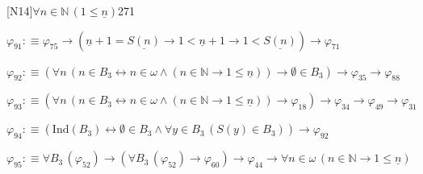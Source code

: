 \begin{fullproof}{[N14]}{$\forall n \in \mathbb{N}\,(1 \leq \underline{n})$}{271}
\begin{abbrevlist}
\item $\varphi_{91} :\equiv \varphi_{75} \to (\underline{n} + 1 = \underline{S(n)} \to 1 < \underline{n} + 1 \to 1 < \underline{S(n)}) \to \varphi_{71}$
\item $\varphi_{92} :\equiv (\forall n\,(n \in B_{3} \leftrightarrow n \in \omega \land (n \in \mathbb{N} \to 1 \leq \underline{n})) \to \emptyset \in B_{3}) \to \varphi_{35} \to \varphi_{88}$
\item $\varphi_{93} :\equiv (\forall n\,(n \in B_{3} \leftrightarrow n \in \omega \land (n \in \mathbb{N} \to 1 \leq \underline{n})) \to \varphi_{18}) \to \varphi_{34} \to \varphi_{49} \to \varphi_{31}$
\item $\varphi_{94} :\equiv (\mathrm{Ind}(B_{3}) \leftrightarrow \emptyset \in B_{3} \land \forall y \in B_{3}\,(S(y) \in B_{3})) \to \varphi_{92}$
\item $\varphi_{95} :\equiv \forall B_{3}\,(\varphi_{52}) \to (\forall B_{3}\,(\varphi_{52}) \to \varphi_{60}) \to \varphi_{44} \to \forall n \in \omega\,(n \in \mathbb{N} \to 1 \leq \underline{n})$
\end{abbrevlist}
\end{fullproof}
